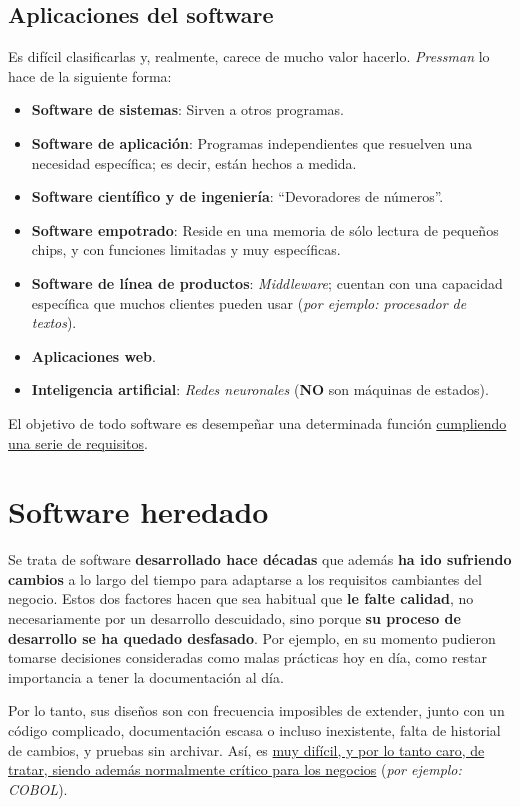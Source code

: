 \subsection{Aplicaciones del software}
Es difícil clasificarlas y, realmente, carece de mucho valor hacerlo. \textit{Pressman} lo hace de la siguiente forma:
\begin{itemize}
    \item \textbf{Software de sistemas}: Sirven a otros programas.
    \item \textbf{Software de aplicación}: Programas independientes que resuelven una necesidad específica; es decir, están hechos a medida.
    \item \textbf{Software científico y de ingeniería}: ``Devoradores de números''.
    \item \textbf{Software empotrado}: Reside en una memoria de sólo lectura de pequeños chips, y con funciones limitadas y muy específicas.
    \item \textbf{Software de línea de productos}: \textit{Middleware}; cuentan con una capacidad específica que muchos clientes pueden usar (\textit{por ejemplo: procesador de textos}).
    \item \textbf{Aplicaciones web}.
    \item \textbf{Inteligencia artificial}: \textit{Redes neuronales} (\textbf{NO} son máquinas de estados).
\end{itemize}
El objetivo de todo software es desempeñar una determinada función \uline{cumpliendo una serie de requisitos}.

\section{Software heredado}
Se trata de software \textbf{desarrollado hace décadas} que además \textbf{ha ido sufriendo cambios} a lo largo del tiempo para adaptarse a los requisitos cambiantes del negocio. Estos dos factores hacen que sea habitual que \textbf{le falte calidad}, no necesariamente por un desarrollo descuidado, sino porque \textbf{su proceso de desarrollo se ha quedado desfasado}. Por ejemplo, en su momento pudieron tomarse decisiones consideradas como malas prácticas hoy en día, como restar importancia a tener la documentación al día.

Por lo tanto, sus diseños son con frecuencia imposibles de extender, junto con un código complicado, documentación escasa o incluso inexistente, falta de historial de cambios, y pruebas sin archivar. Así, es \uline{muy difícil, y por lo tanto caro, de tratar, siendo además normalmente crítico para los negocios} (\textit{por ejemplo: COBOL}).


